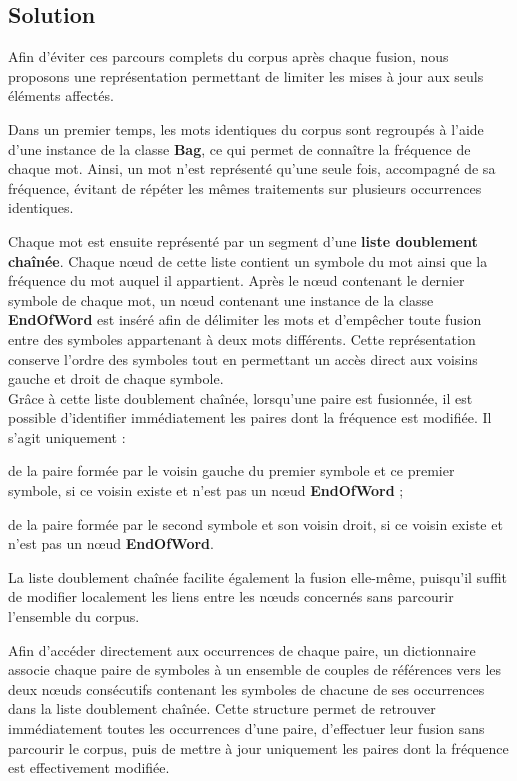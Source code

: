 \documentclass[12pt,a4paper]{report}
\begin{document}
	\subsection{Solution}
	
	Afin d'éviter ces parcours complets du corpus après chaque fusion, nous proposons une représentation permettant de limiter les mises à jour aux seuls éléments affectés.
	
	Dans un premier temps, les mots identiques du corpus sont regroupés à l'aide d'une instance de la classe \textbf{Bag}, ce qui permet de connaître la fréquence de chaque mot. Ainsi, un mot n'est représenté qu'une seule fois, accompagné de sa fréquence, évitant de répéter les mêmes traitements sur plusieurs occurrences identiques.
	
	Chaque mot est ensuite représenté par un segment d'une \textbf{liste doublement chaînée}. Chaque nœud de cette liste contient un symbole du mot ainsi que la fréquence du mot auquel il appartient. Après le nœud contenant le dernier symbole de chaque mot, un nœud contenant une instance de la classe \textbf{EndOfWord} est inséré afin de délimiter les mots et d'empêcher toute fusion entre des symboles appartenant à deux mots différents. Cette représentation conserve l'ordre des symboles tout en permettant un accès direct aux voisins gauche et droit de chaque symbole.\\
	Grâce à cette liste doublement chaînée, lorsqu'une paire est fusionnée, il est possible d'identifier immédiatement les paires dont la fréquence est modifiée. Il s'agit uniquement :
	
	\begin{itemizeFB}
		\item de la paire formée par le voisin gauche du premier symbole et ce premier symbole, si ce voisin existe et n'est pas un nœud \textbf{EndOfWord} ;
		\item de la paire formée par le second symbole et son voisin droit, si ce voisin existe et n'est pas un nœud \textbf{EndOfWord}.
	\end{itemizeFB}
	La liste doublement chaînée facilite également la fusion elle-même, puisqu'il suffit de modifier localement les liens entre les nœuds concernés sans parcourir l'ensemble du corpus.
	
	Afin d'accéder directement aux occurrences de chaque paire, un dictionnaire associe chaque paire de symboles à un ensemble de couples de références vers les deux nœuds consécutifs contenant les symboles de chacune de ses occurrences dans la liste doublement chaînée. Cette structure permet de retrouver immédiatement toutes les occurrences d'une paire, d'effectuer leur fusion sans parcourir le corpus, puis de mettre à jour uniquement les paires dont la fréquence est effectivement modifiée.
	
\end{document}
